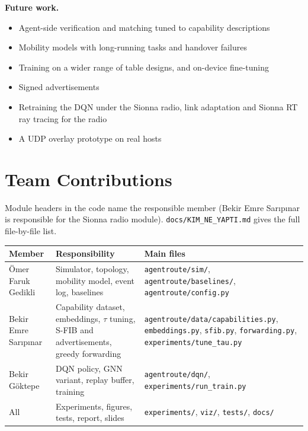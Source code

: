 \documentclass[journal]{IEEEtran}
\begin{document}
\textbf{Future work.}

\begin{itemize}
\item Agent-side verification and matching tuned to capability descriptions
\item Mobility models with long-running tasks and handover failures
\item Training on a wider range of table designs, and on-device fine-tuning
\item Signed advertisements
\item Retraining the DQN under the Sionna radio, link adaptation and Sionna RT ray tracing for the radio
\item A UDP overlay prototype on real hosts
\end{itemize}

\section{Team Contributions}
Module headers in the code name the responsible member (Bekir Emre Sar{\i}p{\i}nar is responsible for the Sionna radio module). \texttt{docs/\allowbreak KIM\_\allowbreak NE\_\allowbreak YAPTI.md} gives the full file-by-file list.

\begin{table}[!t]
\centering
\footnotesize
\begin{tabularx}{\textwidth}{>{\hsize=0.572\hsize\raggedright\arraybackslash}X>{\hsize=1.180\hsize\raggedright\arraybackslash}X>{\hsize=1.248\hsize\raggedright\arraybackslash}X}
\toprule
Member & Responsibility & Main files \\
\midrule
\"Omer Faruk Gedikli & Simulator, topology, mobility model, event log, baselines & \texttt{agentroute/\allowbreak sim/\allowbreak *}, \texttt{agentroute/\allowbreak baselines/\allowbreak *}, \texttt{agentroute/\allowbreak config.py} \\
Bekir Emre Sar{\i}p{\i}nar & Capability dataset, embeddings, $\tau$ tuning, S-FIB and advertisements, greedy forwarding & \texttt{agentroute/\allowbreak data/\allowbreak capabilities.py}, \texttt{embeddings.py}, \texttt{sfib.py}, \texttt{forwarding.py}, \texttt{experiments/\allowbreak tune\_\allowbreak tau.py} \\
Bekir G\"oktepe & DQN policy, GNN variant, replay buffer, training & \texttt{agentroute/\allowbreak dqn/\allowbreak *}, \texttt{experiments/\allowbreak run\_\allowbreak train.py} \\
All & Experiments, figures, tests, report, slides & \texttt{experiments/\allowbreak }, \texttt{viz/\allowbreak }, \texttt{tests/\allowbreak }, \texttt{docs/\allowbreak } \\
\bottomrule
\end{tabularx}
\end{table}
\end{document}
